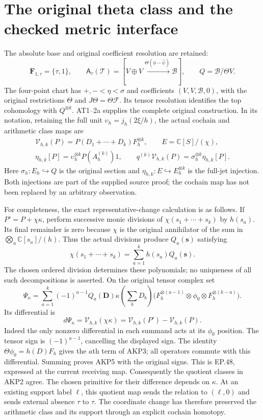 \documentclass[11pt,a4paper]{article}
\begin{document}

\clearpage
\section{The original theta class and the checked metric interface}
\label{sec:AKP}
The absolute base and original coefficient resolution are retained:
\[
 \mathbf F_{1,\tau}=\{\tau,1\},\qquad
 \mathsf A_\tau(\mathcal T)=
 [V\oplus V\xrightarrow{\Theta(\phi-\widehat\psi)}\mathscr B],
 \qquad Q=\mathscr B/\Theta V.
 \tag{AKP1}
\]
The four-point chart has $+,-<\eta<\sigma$ and coefficients
$(V,V,\mathscr B,0)$, with the original restrictions $\Theta$ and
$J\Theta=\Theta\mathcal F$. Its tensor resolution identifies the top
cohomology with $Q^{\otimes k}$. AT1--2a supplies the complete original
construction. In its notation, retaining the full unit
$\upsilon_h=j_h(2\xi/h)$, the actual cochain and arithmetic class maps are
\[
 \begin{gathered}
 \mathcal V_{h,k}(P)=P(D_1+\cdots+D_k)F_h^{\otimes k},\qquad
 E=\mathbb C[S]/(\chi),\\
 \eta_{h,k}[P]=\upsilon_h^{\otimes k}P(A_h^{(k)})1,\qquad
 q^{(k)}\mathcal V_{h,k}(P)
   =\sigma_h^{\otimes k}\eta_{h,k}[P].
 \end{gathered}\tag{AKP2}
\]
Here $\sigma_h:E_h\hookrightarrow Q$ is the original section and
$\eta_{h,k}:E\hookrightarrow E_h^{\otimes k}$ is the full-jet injection.
Both injections are part of the supplied source proof; the cochain map
has not been replaced by an arbitrary observation.

For completeness, the exact representative-change calculation is as
follows. If $P'=P+\chi\kappa$, perform successive monic divisions of
$\chi(s_1+\cdots+s_k)$ by $h(s_a)$. Its final remainder is zero because
$\chi$ is the original annihilator of the sum in
$\bigotimes_a\mathbb C[s_a]/(h)$. Thus the actual divisions produce
$Q_a(\mathbf s)$ satisfying
\[
 \chi(s_1+\cdots+s_k)=\sum_{a=1}^kh(s_a)Q_a(\mathbf s).
 \tag{AKP3}
\]
The chosen ordered division determines these polynomials; no uniqueness
of all such decompositions is asserted. On the original tensor complex set
\[
 \Psi_\kappa=\sum_{a=1}^k(-1)^{a-1}
 Q_a(\mathbf D)\kappa\left(\sum_bD_b\right)
 \bigl(F_h^{\otimes(a-1)}\otimes\phi_0
                  \otimes F_h^{\otimes(k-a)}\bigr).
 \tag{AKP4}
\]
Its differential is
\[
 d\Psi_\kappa=\mathcal V_{h,k}(\chi\kappa)
             =\mathcal V_{h,k}(P')-\mathcal V_{h,k}(P).
 \tag{AKP5}
\]
Indeed the only nonzero differential in each summand acts at its
$\phi_0$ position. The tensor sign is $(-1)^{a-1}$, cancelling the
displayed sign. The identity $\Theta\phi_0=h(D)F_h$ gives the $a$th
term of AKP3; all operators commute with this differential. Summing
proves AKP5 with the original signs. This is EP.48, expressed at the
current receiving map. Consequently the quotient classes in AKP2 agree.
The chosen primitive for their difference depends on $\kappa$.
At an existing support label $\ell$, this quotient map sends the
relation to $(\ell,0)$ and sends external absence $\tau$ to $\tau$.
The coordinate change has therefore preserved the arithmetic class
and its support through an explicit cochain homotopy.
\end{document}
